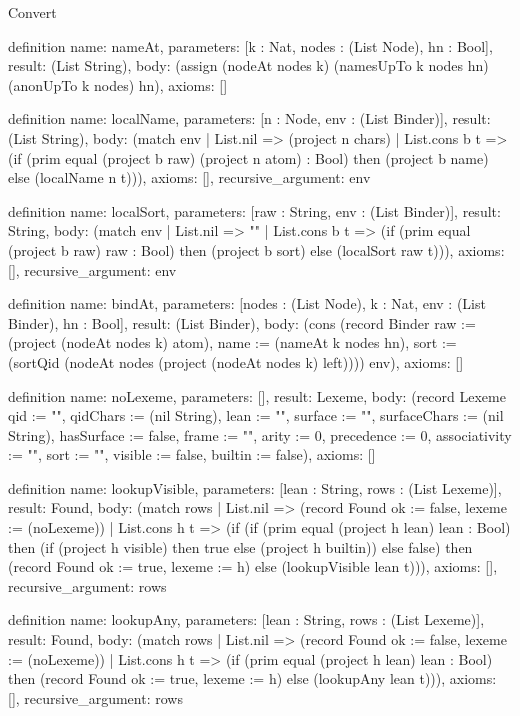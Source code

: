 \begin{lexlean}{Convert}
\begin{semanticmodule}
definition{
  name: nameAt,
  parameters: [k : Nat, nodes : (List Node), hn : Bool],
  result: (List String),
  body: (assign (nodeAt nodes k) (namesUpTo k nodes hn) (anonUpTo k nodes) hn),
  axioms: []
}

definition{
  name: localName,
  parameters: [n : Node, env : (List Binder)],
  result: (List String),
  body: (match env
    | List.nil => (project n chars)
    | List.cons b t => (if (prim equal (project b raw) (project n atom) : Bool) then (project b name) else (localName n t))),
  axioms: [],
  recursive_argument: env
}

definition{
  name: localSort,
  parameters: [raw : String, env : (List Binder)],
  result: String,
  body: (match env
    | List.nil => ""
    | List.cons b t => (if (prim equal (project b raw) raw : Bool) then (project b sort) else (localSort raw t))),
  axioms: [],
  recursive_argument: env
}

definition{
  name: bindAt,
  parameters: [nodes : (List Node), k : Nat, env : (List Binder), hn : Bool],
  result: (List Binder),
  body: (cons (record Binder {raw := (project (nodeAt nodes k) atom), name := (nameAt k nodes hn), sort := (sortQid (nodeAt nodes (project (nodeAt nodes k) left)))}) env),
  axioms: []
}

definition{
  name: noLexeme,
  parameters: [],
  result: Lexeme,
  body: (record Lexeme {qid := "", qidChars := (nil String), lean := "", surface := "", surfaceChars := (nil String), hasSurface := false, frame := "", arity := 0, precedence := 0, associativity := "", sort := "", visible := false, builtin := false}),
  axioms: []
}

definition{
  name: lookupVisible,
  parameters: [lean : String, rows : (List Lexeme)],
  result: Found,
  body: (match rows
    | List.nil => (record Found {ok := false, lexeme := (noLexeme)})
    | List.cons h t => (if (if (prim equal (project h lean) lean : Bool) then (if (project h visible) then true else (project h builtin)) else false) then (record Found {ok := true, lexeme := h}) else (lookupVisible lean t))),
  axioms: [],
  recursive_argument: rows
}

definition{
  name: lookupAny,
  parameters: [lean : String, rows : (List Lexeme)],
  result: Found,
  body: (match rows
    | List.nil => (record Found {ok := false, lexeme := (noLexeme)})
    | List.cons h t => (if (prim equal (project h lean) lean : Bool) then (record Found {ok := true, lexeme := h}) else (lookupAny lean t))),
  axioms: [],
  recursive_argument: rows
}


\end{semanticmodule}
\end{lexlean}
